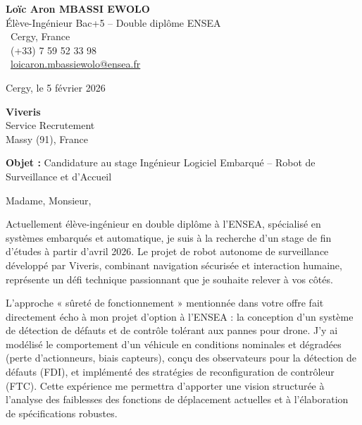 \documentclass[a4paper,11pt]{article}
\begin{document}
\noindent
\begin{minipage}[t]{0.5\textwidth}
    \textbf{Loïc Aron MBASSI EWOLO}\\
    Élève-Ingénieur Bac+5 -- Double diplôme ENSEA\\[3pt]
    \faMapMarker\ Cergy, France\\
    \faPhone\ (+33) 7 59 52 33 98\\
    \faEnvelope\ \href{mailto:loicaron.mbassiewolo@ensea.fr}{loicaron.mbassiewolo@ensea.fr}
\end{minipage}
\hfill
\begin{minipage}[t]{0.4\textwidth}
    \raggedleft
    Cergy, le 5 février 2026
\end{minipage}

\vspace{1.2cm}

\hfill
\begin{minipage}[t]{0.5\textwidth}
    \raggedleft
    \textbf{Viveris}\\
    Service Recrutement\\
    Massy (91), France
\end{minipage}

\vspace{1cm}

\noindent\textbf{Objet :} Candidature au stage Ingénieur Logiciel Embarqué -- Robot de Surveillance et d'Accueil

\vspace{0.8cm}

Madame, Monsieur,

Actuellement élève-ingénieur en double diplôme à l'ENSEA, spécialisé en systèmes embarqués et automatique, je suis à la recherche d'un stage de fin d'études à partir d'avril 2026. Le projet de robot autonome de surveillance développé par Viveris, combinant navigation sécurisée et interaction humaine, représente un défi technique passionnant que je souhaite relever à vos côtés.

L'approche « sûreté de fonctionnement » mentionnée dans votre offre fait directement écho à mon projet d'option à l'ENSEA : la conception d'un système de détection de défauts et de contrôle tolérant aux pannes pour drone. J'y ai modélisé le comportement d'un véhicule en conditions nominales et dégradées (perte d'actionneurs, biais capteurs), conçu des observateurs pour la détection de défauts (FDI), et implémenté des stratégies de reconfiguration de contrôleur (FTC). Cette expérience me permettra d'apporter une vision structurée à l'analyse des faiblesses des fonctions de déplacement actuelles et à l'élaboration de spécifications robustes.
\end{document}
